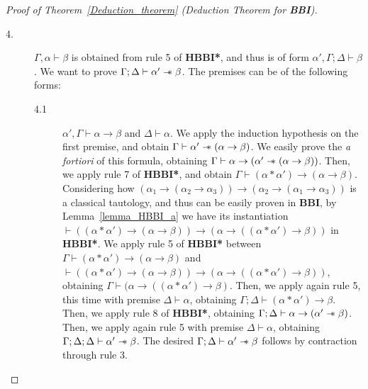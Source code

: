 \documentclass[a4paper]{article}
\newcommand\magicwand{\mathrel{-\mkern-6mu*}}
\newcommand{\BBI}{\textbf{BBI}\xspace}
\begin{document}
\begin{proof}[Proof of Theorem~\ref{Deduction_theorem} (Deduction Theorem for \BBI)]
\begin{description}
        
        
        
        
        
        
        
        

        \item[4.] $\Gamma ,\alpha\vdash \beta$ is obtained from rule 5 of \textbf{HBBI*}, and thus is of form $\alpha', \Gamma; \Delta \vdash \beta$. We want to prove $\Gamma; \Delta \vdash \alpha' \magicwand \beta$. The premises can be of the following forms:

\begin{description}

\item[4.1] $\alpha', \Gamma \vdash \alpha \rightarrow \beta$ and $\Delta\vdash \alpha$. We apply the induction hypothesis on the first premise, and obtain $\Gamma \vdash \alpha' \magicwand (\alpha \rightarrow \beta)$. We easily prove the \textit{a fortiori} of this formula, obtaining $\Gamma \vdash \alpha \rightarrow (\alpha' \magicwand (\alpha \rightarrow \beta))$. Then, we apply rule 7 of \textbf{HBBI*}, and obtain $\Gamma \vdash (\alpha * \alpha') \rightarrow (\alpha \rightarrow \beta)$. Considering how $(\alpha_1 \rightarrow (\alpha_2 \rightarrow \alpha_3)) \rightarrow (\alpha_2 \rightarrow (\alpha_1 \rightarrow \alpha_3))$ is a classical tautology, and thus can be easily proven in \BBI, by Lemma~\ref{lemma_HBBI_a} we have its instantiation $\vdash((\alpha* \alpha') \rightarrow (\alpha \rightarrow \beta)) \rightarrow (\alpha \rightarrow ((\alpha*\alpha') \rightarrow \beta))$ in \textbf{HBBI*}. We apply rule 5 of \textbf{HBBI*} between $\Gamma \vdash (\alpha * \alpha') \rightarrow (\alpha \rightarrow \beta)$ and $\vdash((\alpha* \alpha') \rightarrow (\alpha \rightarrow \beta)) \rightarrow (\alpha \rightarrow ((\alpha*\alpha') \rightarrow \beta))$, obtaining $\Gamma \vdash(\alpha \rightarrow ((\alpha*\alpha') \rightarrow \beta)$. Then, we apply again rule 5, this time with premise $\Delta \vdash \alpha$, obtaining $\Gamma; \Delta \vdash (\alpha * \alpha') \rightarrow \beta$. Then, we apply rule 8 of \textbf{HBBI*}, obtaining $\Gamma; \Delta \vdash \alpha \rightarrow (\alpha' \magicwand \beta)$. Then, we apply again rule 5 with premise $\Delta \vdash \alpha$, obtaining $\Gamma; \Delta; \Delta \vdash \alpha' \magicwand \beta$. The desired $\Gamma; \Delta \vdash \alpha' \magicwand \beta$ follows by contraction through rule 3.


\end{description}
\end{description}
\end{proof}
\end{document}
